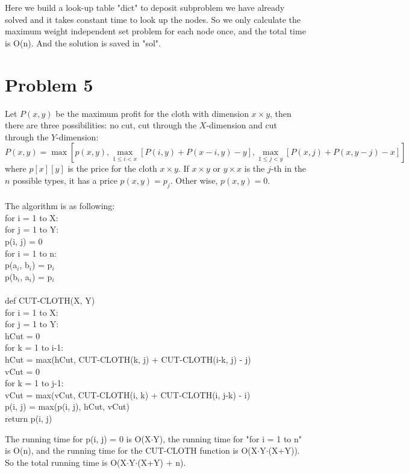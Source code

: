 \documentclass[twoside,11pt]{homework}
\begin{document}
Here we build a look-up table "dict" to deposit subproblem we have already solved and it takes constant time to look up the nodes.
So we only calculate the maximum weight independent set problem for each node once, and the total time is O(n).
And the solution is saved in "sol".

\section*{Problem 5}
Let $P(x, y)$ be the maximum profit for the cloth with dimension $x \times y$, then there are three possibilities: no cut, cut through the $X$-dimension and cut through the $Y$-dimension:
\begin{equation}
P(x, y) = \max[p(x, y),  \max_{1 \le i < x}[P(i, y) + P(x-i, y) - y], \max_{1 \le j < y}[P(x, j) + P(x, y - j) - x]]
\end{equation}
where $p[x][y]$ is the price for the cloth $x \times y$. 
If  $x \times y$ or  $y \times x$ is the $j$-th in the $n$ possible types, it has a price $p(x, y) = p_j$. 
Other wise, $p(x, y) = 0$.
\\\\
The algorithm is as following:\\
for i = 1 to X: \\
\hspace*{8mm} for j = 1 to Y:\\
\hspace*{16mm} p(i, j) = 0\\
for i = 1 to n:\\
\hspace*{8mm} p(a$_i$, b$_i$) = p$_i$ \\
\hspace*{8mm} p(b$_i$, a$_i$) = p$_i$ \\\\
def CUT-CLOTH(X, Y)\\
\hspace*{8mm}for i = 1 to X: \\
\hspace*{16mm} for j = 1 to Y:\\
\hspace*{24mm} hCut = 0 \\
\hspace*{24mm} for k = 1 to i-1:\\
\hspace*{32mm} hCut = max(hCut, CUT-CLOTH(k, j) + CUT-CLOTH(i-k, j) - j)\\
\hspace*{24mm} vCut = 0 \\
\hspace*{24mm} for k = 1 to j-1:\\
\hspace*{32mm} vCut = max(vCut, CUT-CLOTH(i, k) + CUT-CLOTH(i, j-k) - i)\\
\hspace*{24mm} p(i, j) = max(p(i, j), hCut, vCut) \\
\hspace*{8mm} return p(i, j)

The running time for p(i, j) = 0 is O(X$\cdot$Y), the running time for "for i = 1 to n" is O(n), and the running time for the CUT-CLOTH function is O(X$\cdot$Y$\cdot$(X+Y)).
So the total running time is O(X$\cdot$Y$\cdot$(X+Y) + n).
\end{document}
